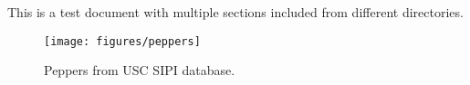 \documentclass{article}
\begin{document}
This is a test document with multiple sections included from different
directories.



\begin{figure}[htb]
	\centering
	\texttt{[image: figures/peppers]}
	\caption{Peppers from USC SIPI database.}
\end{figure}
\end{document}
